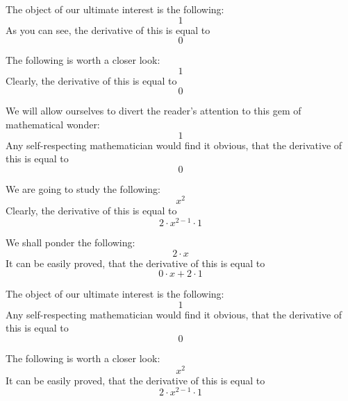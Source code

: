 \documentclass{article}
\begin{document}
The object of our ultimate interest is the following:
\begin{equation}
1 
\end{equation}
As you can see, the derivative of this is equal to
\begin{equation}
0 
\end{equation}

The following is worth a closer look:
\begin{equation}
1 
\end{equation}
Clearly, the derivative of this is equal to
\begin{equation}
0 
\end{equation}

We will allow ourselves to divert the reader's attention to this gem of mathematical wonder:
\begin{equation}
1 
\end{equation}
Any self-respecting mathematician would find it obvious, that the derivative of this is equal to
\begin{equation}
0 
\end{equation}

We are going to study the following:
\begin{equation}
x ^{2 } 
\end{equation}
Clearly, the derivative of this is equal to
\begin{equation}
2 \cdot x ^{2 - 1 } \cdot 1 
\end{equation}

We shall ponder the following:
\begin{equation}
2 \cdot x 
\end{equation}
It can be easily proved, that the derivative of this is equal to
\begin{equation}
0 \cdot x + 2 \cdot 1 
\end{equation}

The object of our ultimate interest is the following:
\begin{equation}
1 
\end{equation}
Any self-respecting mathematician would find it obvious, that the derivative of this is equal to
\begin{equation}
0 
\end{equation}

The following is worth a closer look:
\begin{equation}
x ^{2 } 
\end{equation}
It can be easily proved, that the derivative of this is equal to
\begin{equation}
2 \cdot x ^{2 - 1 } \cdot 1 
\end{equation}
\end{document}
